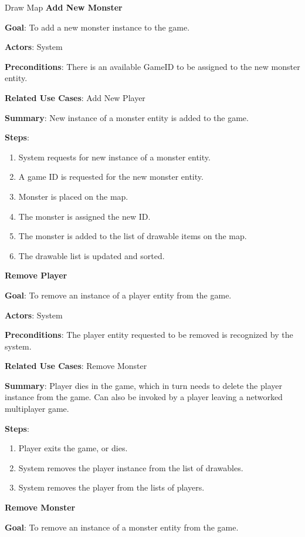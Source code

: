 \documentclass[12pt]{report}
\begin{document}
\begin{subsection}{Draw Map}
\textbf{Add New Monster} 

\textbf{Goal}: 
To add a new monster instance to the game.

\textbf{Actors}: 
System

\textbf{Preconditions}: 
There is an available GameID to be assigned to the new monster entity.

\textbf{Related Use Cases}: 
Add New Player

\textbf{Summary}: 
New instance of a monster entity is added to the game. 

\textbf{Steps}:
\begin{enumerate}
	\item System requests for new instance of a monster entity.
	\item A game ID is requested for the new monster entity.
	\item Monster is placed on the map.
	\item The monster is assigned the new ID.
	\item The monster is added to the list of drawable items on the map.
	\item The drawable list is updated and sorted.
\end{enumerate}

\textbf{Remove Player}

\textbf{Goal}: 
To remove an instance of a player entity from the game.

\textbf{Actors}: 
System

\textbf{Preconditions}: 
The player entity requested to be removed is recognized by the system.

\textbf{Related Use Cases}: 
Remove Monster

\textbf{Summary}: 
Player dies in the game, which in turn needs to delete the player instance from the game. Can also be invoked by a player leaving a networked multiplayer game.

\textbf{Steps}:
\begin{enumerate}
	\item Player exits the game, or dies.
	\item System removes the player instance from the list of drawables.
	\item System removes the player from the lists of players.
\end{enumerate}

\textbf{Remove Monster}

\textbf{Goal}: 
To remove an instance of a monster entity from the game.


\end{subsection}
\end{document}
